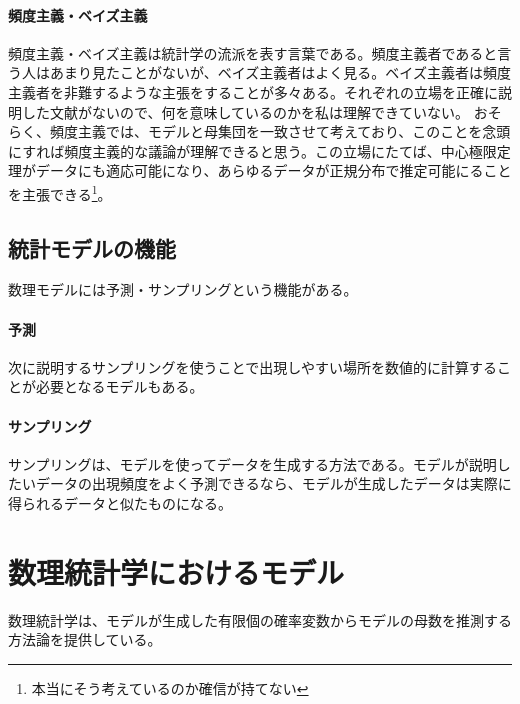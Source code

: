 {}
\begin{mybox}
    \paragraph{頻度主義・ベイズ主義}
    頻度主義・ベイズ主義は統計学の流派を表す言葉である。頻度主義者であると言う人はあまり見たことがないが、ベイズ主義者はよく見る。ベイズ主義者は頻度主義者を非難するような主張をすることが多々ある。それぞれの立場を正確に説明した文献がないので、何を意味しているのかを私は理解できていない。
    おそらく、頻度主義では、モデルと母集団を一致させて考えており、このことを念頭にすれば頻度主義的な議論が理解できると思う。この立場にたてば、中心極限定理がデータにも適応可能になり、あらゆるデータが正規分布で推定可能にることを主張できる\footnote{本当にそう考えているのか確信が持てない}。
\end{mybox}
\fi


\begin{brokenbox}[colback=yellow]
    \blindtext[5]
  \end{brokenbox}
\fi 

\clearpage
\clearpage
\subsection{統計モデルの機能}
数理モデルには予測・サンプリングという機能がある。%
\paragraph{予測}

次に説明するサンプリングを使うことで出現しやすい場所を数値的に計算することが必要となるモデルもある。

\paragraph{サンプリング}
サンプリングは、モデルを使ってデータを生成する方法である。モデルが説明したいデータの出現頻度をよく予測できるなら、モデルが生成したデータは実際に得られるデータと似たものになる。




\section{数理統計学におけるモデル}
数理統計学は、モデルが生成した有限個の確率変数からモデルの母数を推測する方法論を提供している。


